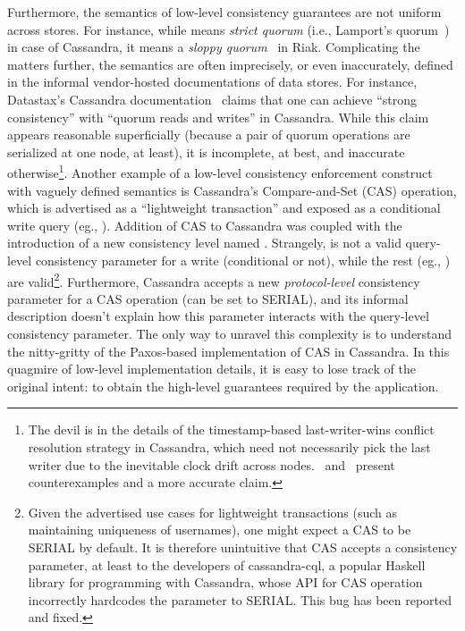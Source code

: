 Furthermore, the semantics of low-level consistency guarantees are not
uniform across stores. For instance, while  means
\emph{strict quorum} (i.e., Lamport's quorum~\cite{LamportQuorum}) in
case of Cassandra, it means a \emph{sloppy quorum}~\cite{Dynamo} in
Riak. Complicating the matters further, the semantics are often
imprecisely, or even inaccurately, defined in the informal
vendor-hosted documentations of data stores. For instance, Datastax's
Cassandra documentation~\cite{dxlwt} claims that one can achieve
``strong consistency'' with ``quorum reads and writes'' in Cassandra.
While this claim appears reasonable superficially (because a pair of
quorum operations are serialized at one node, at least), it is
incomplete, at best, and inaccurate otherwise\footnote{The devil is in
the details of the timestamp-based last-writer-wins conflict
resolution strategy in Cassandra, which need not necessarily pick the
last writer due to the inevitable clock drift across
nodes.~\cite{TyconCassandra} and~\cite{JepsenCassandra} present
counterexamples and a more accurate claim.}. Another example of a
low-level consistency enforcement construct with vaguely defined
semantics is Cassandra's Compare-and-Set (CAS) operation, which is
advertised as a ``lightweight transaction'' and exposed as a
conditional write query (eg., ).  Addition of CAS to Cassandra was coupled with the
introduction of a new consistency level named .  Strangely,
 is not a valid query-level consistency parameter for a
write (conditional or not), while the rest (eg., ) are
valid\footnote{Given the advertised use cases for lightweight
transactions (such as maintaining uniqueness of usernames), one might
expect a CAS to be SERIAL by default. It is therefore unintuitive that
CAS accepts a consistency parameter, at least to the developers of
cassandra-cql, a popular Haskell library for programming with
Cassandra, whose API for CAS operation incorrectly hardcodes the
parameter to SERIAL. This bug has been reported and fixed.}.
Furthermore, Cassandra accepts a new \emph{protocol-level} consistency
parameter for a CAS operation (can be set to SERIAL), and its informal
description doesn't explain how this parameter interacts with the
query-level consistency parameter.  The only way to unravel this
complexity is to understand the nitty-gritty of the Paxos-based
implementation of CAS in Cassandra. In this quagmire of low-level
implementation details, it is easy to lose track of the original
intent: to obtain the high-level guarantees required by the
application.  

